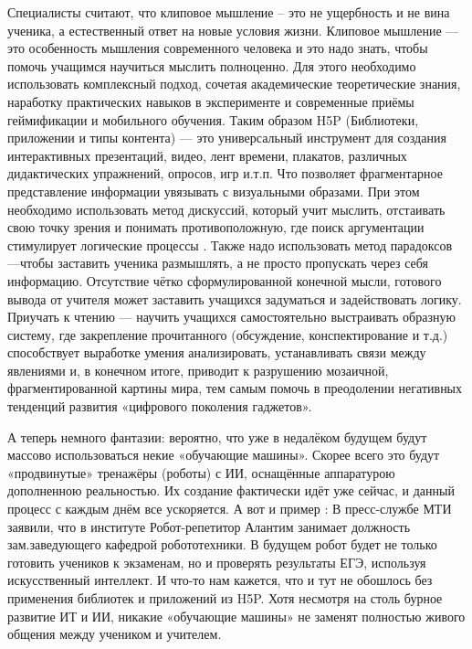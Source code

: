 \documentclass[10pt, a5paper]{article}
\begin{document}
Специалисты считают, что клиповое мышление – это не ущербность и не вина ученика, а естественный ответ на новые условия жизни. Клиповое мышление — это особенность мышления современного человека и это надо знать, чтобы помочь учащимся научиться мыслить полноценно. Для этого необходимо использовать комплексный подход, сочетая академические теоретические знания, наработку практических навыков в эксперименте и современные приёмы геймификации и мобильного обучения. Таким образом H5P (Библиотеки, приложении и типы контента) — это универсальный инструмент для создания интерактивных презентаций, видео, лент времени, плакатов, различных дидактических упражнений, опросов, игр и.т.п. Что позволяет фрагментарное представление информации увязывать с визуальными образами. При этом необходимо использовать метод дискуссий, который учит мыслить, отстаивать свою точку зрения и понимать противоположную, где поиск аргументации стимулирует логические процессы \cite{bib6}. 
Также надо использовать метод парадоксов —чтобы заставить ученика размышлять, а не просто пропускать через себя информацию. Отсутствие чётко сформулированной конечной мысли, готового вывода от учителя может заставить учащихся задуматься и задействовать логику. Приучать к чтению — научить учащихся самостоятельно выстраивать образную систему, где закрепление прочитанного (обсуждение, конспектирование и т.д.) способствует выработке умения анализировать, устанавливать связи между явлениями и, в конечном итоге, приводит к разрушению мозаичной, фрагментированной картины мира, тем самым помочь в преодолении негативных тенденций развития «цифрового поколения гаджетов».

А теперь немного фантазии: вероятно, что уже в недалёком будущем будут массово использоваться некие «обучающие машины». Скорее всего это будут «продвинутые» тренажёры (роботы) с ИИ, оснащённые аппаратурою дополненною реальностью. Их создание фактически идёт уже сейчас, и данный процесс с каждым днём все ускоряется. А вот и пример \cite{bib7}: В пресс-службе МТИ заявили, что в институте Робот-репетитор Алантим занимает должность зам.заведующего кафедрой робототехники. В будущем робот будет не только готовить учеников к экзаменам, но и проверять результаты ЕГЭ, используя искусственный интеллект. И что-то нам кажется, что и тут не обошлось без применения библиотек и приложений из H5P. Хотя несмотря на столь бурное развитие ИТ и ИИ, никакие «обучающие машины» не заменят полностью живого общения между учеником и учителем.
\end{document}
